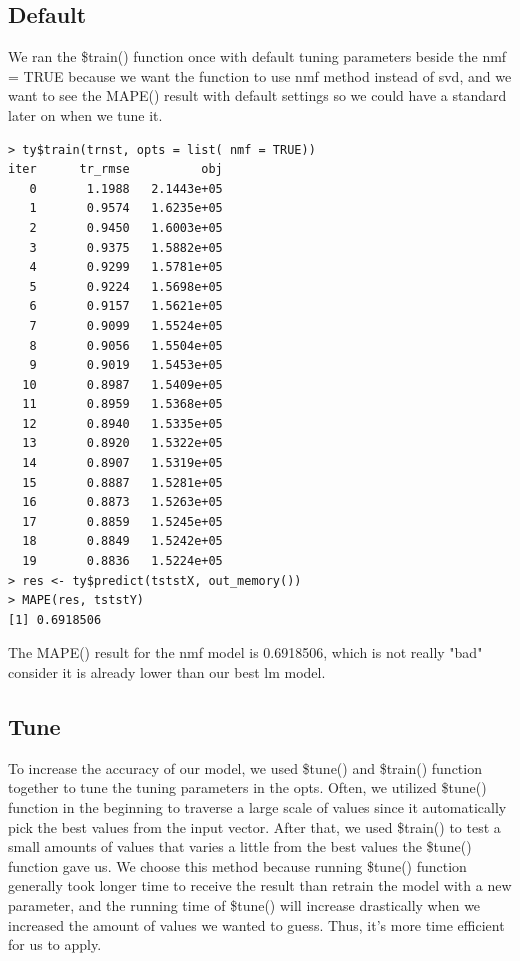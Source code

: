 \documentclass[11pt]{article}
\newcommand\tab[1][0.5cm]{\hspace*{#1}}
\begin{document}
\subsection{Default}
\tab{}We ran the \$train() function once with default tuning parameters beside the nmf = TRUE because we want the function to use nmf method instead of svd, and we want to see the MAPE() result with default settings so we could have a standard later on when we tune it.
\begin{verbatim}
> ty$train(trnst, opts = list( nmf = TRUE))
iter      tr_rmse          obj
   0       1.1988   2.1443e+05
   1       0.9574   1.6235e+05
   2       0.9450   1.6003e+05
   3       0.9375   1.5882e+05
   4       0.9299   1.5781e+05
   5       0.9224   1.5698e+05
   6       0.9157   1.5621e+05
   7       0.9099   1.5524e+05
   8       0.9056   1.5504e+05
   9       0.9019   1.5453e+05
  10       0.8987   1.5409e+05
  11       0.8959   1.5368e+05
  12       0.8940   1.5335e+05
  13       0.8920   1.5322e+05
  14       0.8907   1.5319e+05
  15       0.8887   1.5281e+05
  16       0.8873   1.5263e+05
  17       0.8859   1.5245e+05
  18       0.8849   1.5242e+05
  19       0.8836   1.5224e+05
> res <- ty$predict(tststX, out_memory())
> MAPE(res, tststY)
[1] 0.6918506
\end{verbatim}

\tab{}The MAPE() result for the nmf model is 0.6918506, which is not really "bad" consider it is already lower than our best lm model.

\subsection{Tune}
\tab{} To increase the accuracy of our model, we used \$tune() and \$train() function together to tune the tuning parameters in the opts. Often, we utilized \$tune() function in the beginning to traverse a large scale of values since it automatically pick the best values from the input vector. After that, we used \$train() to test a small amounts of values that varies a little from the best values the \$tune() function gave us. We choose this method because running \$tune() function generally took longer time to receive the result than retrain the model with a new parameter, and the running time of \$tune() will increase drastically when we increased the amount of values we wanted to guess. Thus, it's more time efficient for us to apply.
\end{document}
